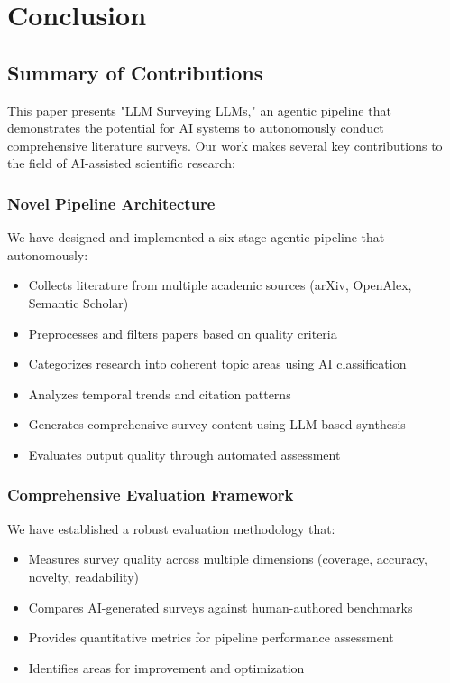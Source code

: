 \section{Conclusion}

\subsection{Summary of Contributions}

This paper presents "LLM Surveying LLMs," an agentic pipeline that demonstrates the potential for AI systems to autonomously conduct comprehensive literature surveys. Our work makes several key contributions to the field of AI-assisted scientific research:

\subsubsection{Novel Pipeline Architecture}

We have designed and implemented a six-stage agentic pipeline that autonomously:
\begin{itemize}
    \item Collects literature from multiple academic sources (arXiv, OpenAlex, Semantic Scholar)
    \item Preprocesses and filters papers based on quality criteria
    \item Categorizes research into coherent topic areas using AI classification
    \item Analyzes temporal trends and citation patterns
    \item Generates comprehensive survey content using LLM-based synthesis
    \item Evaluates output quality through automated assessment
\end{itemize}

\subsubsection{Comprehensive Evaluation Framework}

We have established a robust evaluation methodology that:
\begin{itemize}
    \item Measures survey quality across multiple dimensions (coverage, accuracy, novelty, readability)
    \item Compares AI-generated surveys against human-authored benchmarks
    \item Provides quantitative metrics for pipeline performance assessment
    \item Identifies areas for improvement and optimization
\end{itemize}

